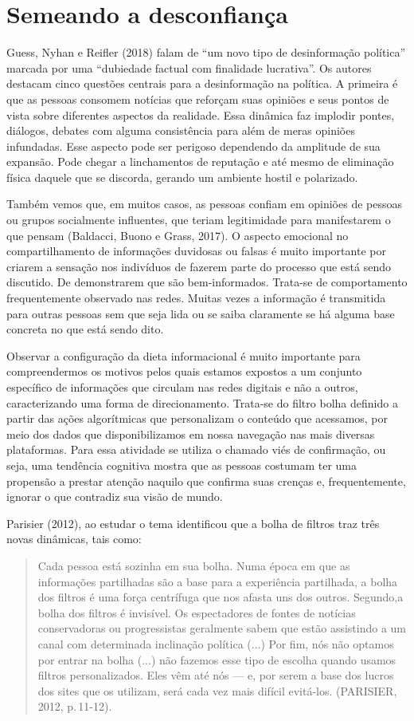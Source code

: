 \section{Semeando a desconfiança}

Guess, Nyhan e Reifler (2018) falam de ``um novo tipo de desinformação
política'' marcada por uma ``dubiedade factual com finalidade
lucrativa''. Os autores destacam cinco questões centrais para a
desinformação na política. A primeira é que as pessoas consomem notícias
que reforçam suas opiniões e seus pontos de vista sobre diferentes
aspectos da realidade. Essa dinâmica faz implodir pontes, diálogos,
debates com alguma consistência para além de meras opiniões infundadas.
Esse aspecto pode ser perigoso dependendo da amplitude de sua expansão.
Pode chegar a linchamentos de reputação e até mesmo de eliminação física
daquele que se discorda, gerando um ambiente hostil e polarizado.

Também vemos que, em muitos casos, as pessoas confiam em opiniões de
pessoas ou grupos socialmente influentes, que teriam legitimidade para
manifestarem o que pensam (Baldacci, Buono e Grass, 2017). O aspecto
emocional no compartilhamento de informações duvidosas ou falsas é muito
importante por criarem a sensação nos indivíduos de fazerem parte do
processo que está sendo discutido. De demonstrarem que são
bem-informados. Trata-se de comportamento frequentemente observado nas
redes. Muitas vezes a informação é transmitida para outras pessoas sem
que seja lida ou se saiba claramente se há alguma base concreta no que
está sendo dito.

Observar a configuração da dieta informacional é muito importante para
compreendermos os motivos pelos quais estamos expostos a um conjunto
específico de informações que circulam nas redes digitais e não a
outros, caracterizando uma forma de direcionamento. Trata-se do filtro
bolha definido a partir das ações algorítmicas que personalizam o
conteúdo que acessamos, por meio dos dados que disponibilizamos em nossa
navegação nas mais diversas plataformas. Para essa atividade se utiliza
o chamado viés de confirmação, ou seja, uma tendência cognitiva mostra
que as pessoas costumam ter uma propensão a prestar atenção naquilo que
confirma suas crenças e, frequentemente, ignorar o que contradiz sua
visão de mundo.

Parisier (2012), ao estudar o tema identificou que a bolha de filtros
traz três novas dinâmicas, tais como:

\begin{quote}
Cada pessoa está sozinha em sua bolha. Numa época em que as informações
partilhadas são a base para a experiência partilhada, a bolha dos
filtros é uma força centrífuga que nos afasta uns dos outros. Segundo,a
bolha dos filtros é invisível. Os espectadores de fontes de notícias
conservadoras ou progressistas geralmente sabem que estão assistindo a
um canal com determinada inclinação política (...) Por fim, nós não
optamos por entrar na bolha (...) não fazemos esse tipo de escolha quando
usamos filtros personalizados. Eles vêm até nós --- e, por serem a base
dos lucros dos sites que os utilizam, será cada vez mais difícil
evitá-los. (PARISIER, 2012, p.\,11-12).
\end{quote}

